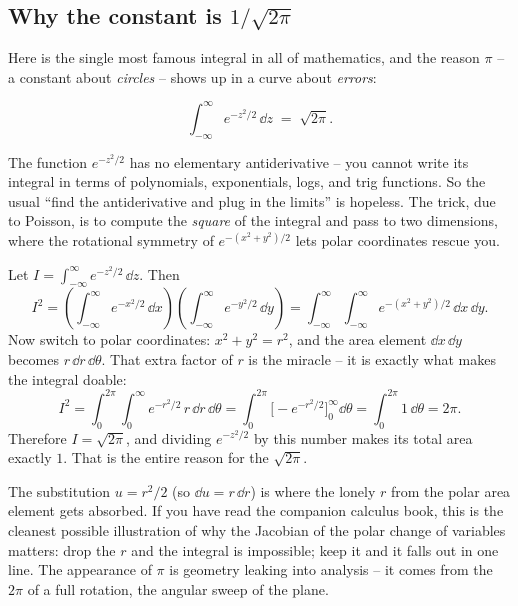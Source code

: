 \subsection{Why the constant is \texorpdfstring{$1/\sqrt{2\pi}$}{1/sqrt(2 pi)}}
\label{ch12:gaussianintegral}

Here is the single most famous integral in all of mathematics, and the reason
$\pi$ -- a constant about \emph{circles} -- shows up in a curve about \emph{errors}:

\begin{theorem}
\label{ch12:thm-gaussint}
\[
  \int_{-\infty}^{\infty} e^{-z^2/2}\,\dd z \;=\; \sqrt{2\pi}.
\]
\end{theorem}

\begin{whybox}
The function $e^{-z^2/2}$ has no elementary antiderivative -- you cannot write its
integral in terms of polynomials, exponentials, logs, and trig functions. So the
usual ``find the antiderivative and plug in the limits'' is hopeless. The trick,
due to Poisson, is to compute the \emph{square} of the integral and pass to two
dimensions, where the rotational symmetry of $e^{-(x^2+y^2)/2}$ lets polar
coordinates rescue you.

Let $I = \int_{-\infty}^{\infty} e^{-z^2/2}\,\dd z$. Then
\[
  I^2 = \left(\int_{-\infty}^{\infty} e^{-x^2/2}\,\dd x\right)
        \left(\int_{-\infty}^{\infty} e^{-y^2/2}\,\dd y\right)
      = \int_{-\infty}^{\infty}\!\int_{-\infty}^{\infty} e^{-(x^2+y^2)/2}\,\dd x\,\dd y.
\]
Now switch to polar coordinates: $x^2 + y^2 = r^2$, and the area element
$\dd x\,\dd y$ becomes $r\,\dd r\,\dd\theta$. That extra factor of $r$ is the
miracle -- it is exactly what makes the integral doable:
\[
  I^2 = \int_{0}^{2\pi}\!\int_{0}^{\infty} e^{-r^2/2}\, r\,\dd r\,\dd\theta
      = \int_{0}^{2\pi}\!\Big[ -e^{-r^2/2}\Big]_{0}^{\infty}\dd\theta
      = \int_{0}^{2\pi} 1\,\dd\theta = 2\pi.
\]
Therefore $I = \sqrt{2\pi}$, and dividing $e^{-z^2/2}$ by this number makes its
total area exactly $1$. That is the entire reason for the $\sqrt{2\pi}$.
\end{whybox}

\begin{connectionbox}
The substitution $u = r^2/2$ (so $\dd u = r\,\dd r$) is where the lonely $r$ from
the polar area element gets absorbed. If you have read the companion calculus
book, this is the cleanest possible illustration of why the Jacobian of the
polar change of variables matters: drop the $r$ and the integral is impossible;
keep it and it falls out in one line. The appearance of $\pi$ is geometry leaking
into analysis -- it comes from the $2\pi$ of a full rotation, the angular sweep of
the plane.
\end{connectionbox}

